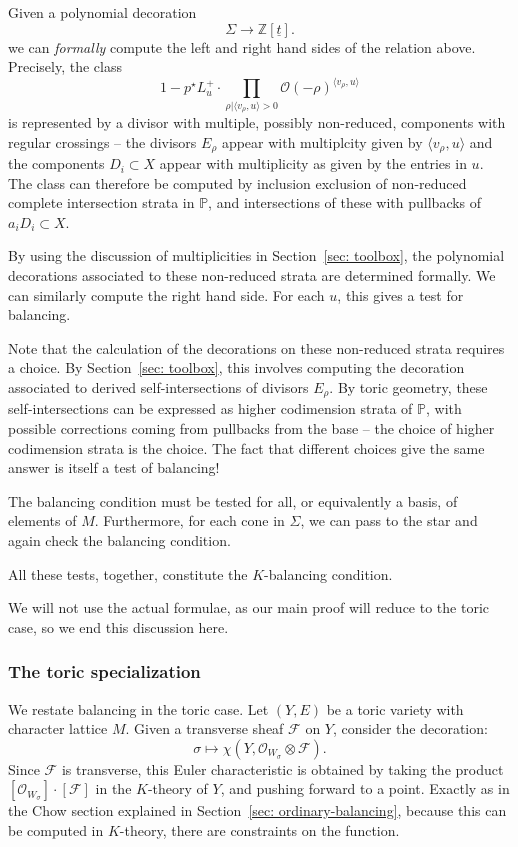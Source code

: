 \documentclass[11pt]{amsart}
\theoremstyle{definition}
\theoremstyle{definition}
\begin{document}
Given a polynomial decoration
\[
\Sigma\to \mathbb Z[\underline t].
\]
we can {\it formally} compute the left and right hand sides of the relation above. Precisely, the class
\[
1-p^\star L_u^{+}\cdot \prod_{\rho|\langle v_\rho,u\rangle >0} \mathcal O(-\rho)^{\langle v_\rho,u\rangle}
\]
is represented by a divisor with multiple, possibly non-reduced, components with regular crossings -- the divisors $E_\rho$ appear with multiplcity given by $\langle v_\rho,u\rangle$ and the components $D_i\subset X$ appear with multiplicity as given by the entries in $u$. The class can therefore be computed by inclusion exclusion of non-reduced complete intersection strata in $\mathbb P$, and intersections of these with pullbacks of $a_iD_i\subset X$. 

By using the discussion of multiplicities in Section~\ref{sec: toolbox}, the polynomial decorations associated to these non-reduced strata are determined formally. We can similarly compute the right hand side. For each $u$, this gives a test for balancing. 

Note that the calculation of the decorations on these non-reduced strata requires a choice. By Section~\ref{sec: toolbox}, this involves computing the decoration associated to derived self-intersections of divisors $E_\rho$. By toric geometry, these self-intersections can be expressed as higher codimension strata of $\mathbb P$, with possible corrections coming from pullbacks from the base -- the choice of higher codimension strata is the choice. The fact that different choices give the same answer is itself a test of balancing!

The balancing condition must be tested for all, or equivalently a basis, of elements of $M$. Furthermore, for each cone in $\Sigma$, we can pass to the star and again check the balancing condition. 

All these tests, together, constitute the $K$-balancing condition. 

We will not use the actual formulae, as our main proof will reduce to the toric case, so we end this discussion here. 

\subsubsection{The toric specialization} We restate balancing in the toric case. Let $(Y,E)$ be a toric variety with character lattice $M$. Given a transverse sheaf $\mathcal F$ on $Y$, consider the decoration:
\[
\sigma\mapsto \chi(Y,\mathcal O_{W_\sigma}\otimes \mathcal F).
\]
Since $\mathcal F$ is transverse, this Euler characteristic is obtained by taking the product $[\mathcal O_{W_\sigma}]\cdot[\mathcal F]$ in the $K$-theory of $Y$, and pushing forward to a point. Exactly as in the Chow section explained in Section~\ref{sec: ordinary-balancing}, because this can be computed in $K$-theory, there are constraints on the function. 
\end{document}
